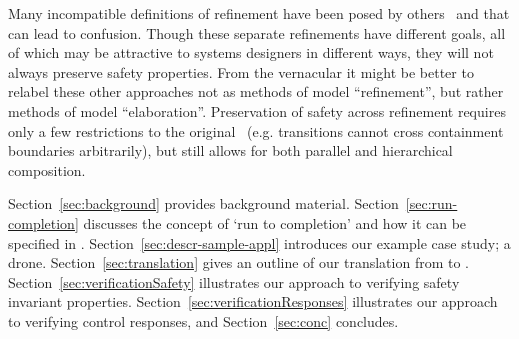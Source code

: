 Many incompatible definitions of refinement have been posed by others~\cite{Syriani_2019,Maraninchi91theargos} and that can lead to confusion.  
Though these separate refinements have different goals, all of which may be attractive to systems designers in different ways,
they will not always preserve safety properties.  
From the \EventB vernacular it might be better to relabel these other approaches not as methods of model ``refinement'', but rather methods of model ``elaboration''.  
Preservation of safety across refinement requires only a few restrictions to the original~\cite{Harel} \SCs (e.g. transitions cannot cross containment boundaries arbitrarily), but still allows for both parallel and hierarchical composition. 


Section~\ref{sec:background} provides background material. 
Section~\ref{sec:run-completion} discusses the \SC concept of `run to completion' and how it can be specified in \EventB. 
Section~\ref{sec:descr-sample-appl} introduces our example case study; a drone. 
Section~\ref{sec:translation} gives an outline of our translation from \SCXML to \EventB. 
Section~\ref{sec:verificationSafety} illustrates our approach to verifying safety invariant properties. Section~\ref{sec:verificationResponses} illustrates our approach to verifying control responses, and Section~\ref{sec:conc} concludes.



